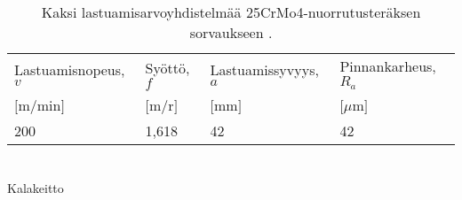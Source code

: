\documentclass{LUT_pohja}[2016/03/09 LUT Dippa Pohja]
\begin{document}
\begin{appendices}
\begin{table}[htb]
\caption{Kaksi lastuamisarvoyhdistelmää 25CrMo4-nuorrutusteräksen sorvaukseen \citep[s. 34]{Varis97}.}
\begin{tabular}{|l|l|l|l|}
	\hline
  Lastuamisnopeus, $v$ & Syöttö, $f$  & Lastuamissyvyys, $a$ & Pinnankarheus, $R_{a}$\\
  $[$m/min$]$ & $[$m/r$]$ & $[$mm$]$ & $[\mu$m$]$\\ \hline
  200 & 1,618 & 42 & 42\\ \hline
\end{tabular}
\end{table}



\newpage
\section{}


\newpage
\section{}
Kalakeitto

\Talteen
\newpage %
\end{appendices}
\end{document}
